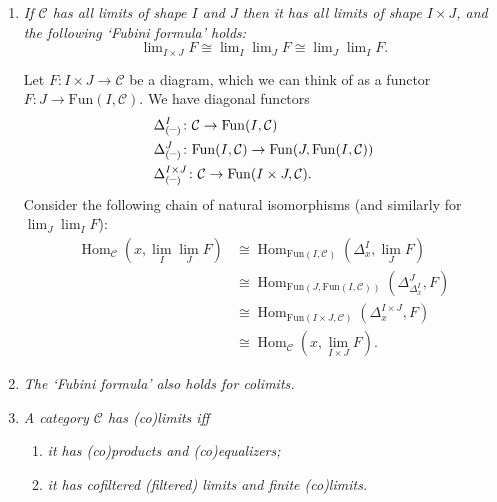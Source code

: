 \documentclass[10pt]{article}
\newcommand{\ccat}{\mathcal{C}}
\newcommand{\Fun}{\mathrm{Fun}}
\newcommand{\blank}{\hbox{--}}
\DeclareMathOperator{\Hom}{Hom}
\begin{document}
                \begin{enumerate}
                    \item \emph{If $\ccat$ has all limits of shape $I$ and $J$ then it has all limits of shape $I\times J$, and the following `Fubini formula' holds:}
                        \begin{equation*}
                            \lim\nolimits_{I\times J}F\cong\lim\nolimits_I\lim\nolimits_J F\cong\lim\nolimits_J\lim\nolimits_I F.
                        \end{equation*}

                        Let $F\colon I\times J\to\ccat$ be a diagram, which we can think of as a functor $F\colon J\to \Fun(I,\ccat)$.
                        We have diagonal functors
                        \begin{align*}
                            &\Delta^I_{(\blank)}\colon\ccat\to\Fun(I,\ccat)\\
                            &\Delta^J_{(\blank)}\colon\Fun(I,\ccat)\to\Fun(J,\Fun(I,\ccat))\\
                            &\Delta^{I\times J}_{(\blank)}\colon\ccat\to\Fun(I\times J,\ccat).
                        \end{align*}
                        Consider the following chain of natural isomorphisms (and similarly for $\lim_J\lim_I F$):
                        \begin{align*}
                            \Hom_\ccat(x,\lim_I\lim_J F) &\cong \Hom_{\Fun(I,\ccat)}(\Delta^I_x,\lim_J F)\\
                            &\cong \Hom_{\Fun(J,\Fun(I,\ccat))}(\Delta^J_{\Delta^I_x},F)\\
                            &\cong \Hom_{\Fun(I\times J,\ccat)}(\Delta^{I\times J}_x,F)\\
                            &\cong \Hom_\ccat(x,\lim_{I\times J}F).
                        \end{align*}
                    \item \emph{The `Fubini formula' also holds for colimits.}
                    \item \emph{A category $\ccat$ has (co)limits iff}
                        \begin{enumerate}
                            \item \emph{it has (co)products and (co)equalizers;}
                            \item \emph{it has cofiltered (filtered) limits and finite (co)limits.}
                        \end{enumerate}


\end{enumerate}
\end{document}
